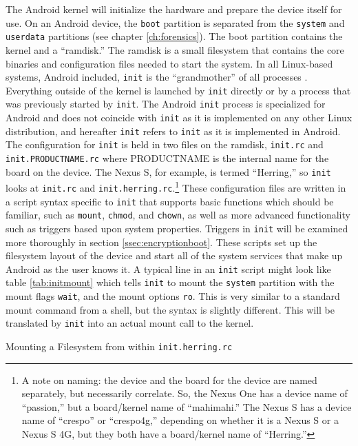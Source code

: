 The Android kernel will initialize the hardware and prepare the device itself for use. On an Android device, the \texttt{boot}
partition is separated from the \texttt{system} and \texttt{userdata} partitions (see chapter \ref{ch:forensics}). The boot
partition contains the kernel and a ``ramdisk.''  The ramdisk is a small filesystem that contains the core binaries and
configuration files needed to start the system. In all Linux-based systems, Android included, \texttt{init} is the ``grandmother''
of all processes \cite{EneaBoot}. Everything outside of the kernel is launched by \texttt{init} directly or by a process that was
previously started by \texttt{init}. The Android \texttt{init} process is specialized for Android and does not coincide with
\texttt{init} as it is implemented on any other Linux distribution, and hereafter \texttt{init} refers to \texttt{init} as it is
implemented in Android.  The configuration for \texttt{init} is held in two files on the ramdisk, \texttt{init.rc} and
\texttt{init.PRODUCTNAME.rc} where PRODUCTNAME is the internal name for the board on the device. The Nexus S, for example, is termed
``Herring,'' so \texttt{init} looks at \texttt{init.rc} and \texttt{init.herring.rc}.\footnote{A note on naming: the device and the
board for the device are named separately, but necessarily correlate. So, the Nexus One has a device name of ``passion,'' but a
board/kernel name of ``mahimahi.'' The Nexus S has a device name of ``crespo'' or ``crespo4g,'' depending on whether it is a Nexus S
or a Nexus S 4G, but they both have a board/kernel name of ``Herring.''} These configuration files are written in a script syntax
specific to \texttt{init} that supports basic functions which should be familiar, such as \texttt{mount}, \texttt{chmod}, and
\texttt{chown}, as well as more advanced functionality such as triggers based upon system properties.  Triggers in \texttt{init}
will be examined more thoroughly in section \ref{ssec:encryptionboot}. These scripts set up the filesystem layout of the device and
start all of the system services that make up Android as the user knows it. A typical line in an \texttt{init} script might look
like table \ref{tab:initmount} which tells \texttt{init} to mount the \texttt{system} partition with the mount flags \texttt{wait}, and the mount
options \texttt{ro}. This is very similar to a standard mount command from a shell, but the syntax is slightly different. This will
be translated by \texttt{init} into an actual mount call to the kernel. 
\begin{table}[htpb]

\caption{Mounting a Filesystem from within \texttt{init.herring.rc}}
\label{tab:initmount}
\end{table}


